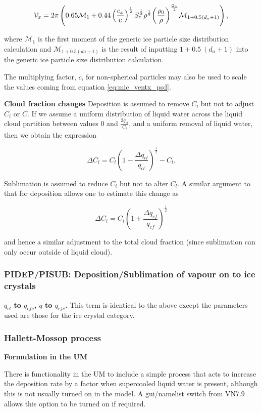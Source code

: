 \documentclass{UMDP_article}
\def\bq{\begin{equation}}
\def\eq{\end{equation}}
\begin{document}
\bq
{{\cal V}_x}=2\pi\left(0.65 \mathcal{M}_1 + 0.44 
\left(\frac{c_x}{\upsilon}\right)^{\frac{1}{2}}S_c^{\frac{1}{3}}\rho^{\frac{1}{2}} 
{\left( \frac{\rho_0}{\rho} \right)}^{ \frac{\mathcal{G}_x}{2}}
\mathcal{M}_{1+0.5(d_a+1)}\right),
\label{eq:mic_ventx_psd}
\eq

where $\mathcal{M}_1$ is the first moment of the generic ice particle size distribution
calculation and $\mathcal{M}_{1+0.5(da+1)}$ is the result of inputting 
$1+0.5~(d_a+1)$ into the generic ice particle size distribution calculation.

The multiplying factor, $c$, for non-spherical particles may also be used to scale
the values coming from equation \ref{eq:mic_ventx_psd}. 

\textbf{Cloud fraction changes} 
Deposition is assumed to remove $C_l$ but not to adjust $C_i$ or $C$. If we assume a
uniform distribution of liquid water across the liquid cloud partition between
values 0 and $\frac{2 q_{cl}}{C_l}$, and a uniform removal of liquid water, then we
obtain the expression

\bq
\Delta C_l = C_l {\left( 1 - \frac{\Delta q_{cl}}{q_{cl}} 
\right) }^{\frac{1}{2}} - C_l .
\eq

Sublimation is assumed to reduce $C_i$ but not to alter $C_l$. A similar argument
to that for deposition allows one to estimate this change as

\bq
\Delta C_i = C_i { \left( 1 + \frac{\Delta q_{cf}}{q_{cf}} \right) }^{\frac{1}{2}}
\eq

and hence a similar adjustment to the total cloud fraction (since sublimation
can only occur outside of liquid cloud). 

\subsubsection{PIDEP/PISUB: Deposition/Sublimation of vapour on to ice crystals}

\textbf{$q_{cl}$ to $q_{cfc}$, $q$ to $q_{cfc}$.}
This term is identical to the above
except the parameters used are
those for the ice crystal category.

\subsubsection{Hallett-Mossop process}

\textbf{Formulation in the UM}

There is functionality in the UM to include a simple
\cite{Hallett:Mossop:1974} process that acts to increase the deposition rate by 
a factor
when supercooled liquid water is present, although this is not usually turned 
on in the model. A gui/namelist switch from VN7.9 allows this option to be turned on
if required.
\end{document}
